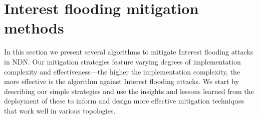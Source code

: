 \documentclass[10pt,conference]{IEEEtran}
\begin{document}




\section{Interest flooding mitigation methods}
\label{sec:design}



In this section we present several algorithms to mitigate Interest flooding attacks in NDN.  Our mitigation strategies feature varying degrees of implementation complexity and effectiveness---the higher the implementation complexity, the more effective is the algorithm against Interest flooding attacks. We start by describing our simple strategies and use the insights and lessons learned from the deployment of these to inform and design more effective mitigation techniques that work well in various topologies.
\end{document}

